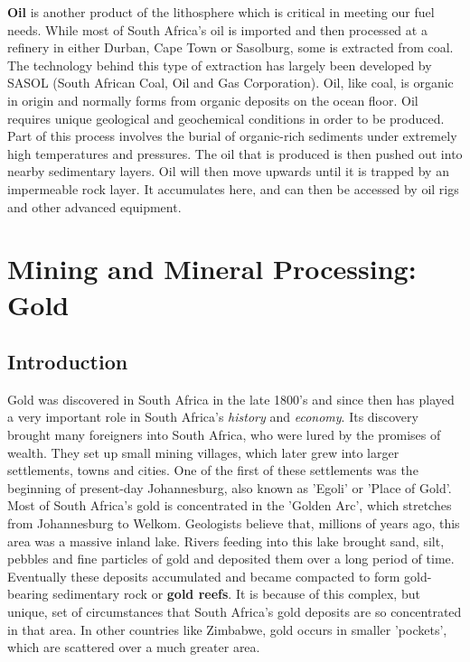 \textbf{Oil} is another product of the lithosphere which is critical in meeting our fuel needs. While most of South Africa's oil is imported and then processed at a refinery in either Durban, Cape Town or Sasolburg, some is extracted from coal. The technology behind this type of extraction has largely been developed by SASOL (South African Coal, Oil and Gas Corporation). Oil, like coal, is organic in origin and normally forms from organic deposits on the ocean floor. Oil requires unique geological and geochemical conditions in order to be produced. Part of this process involves the burial of organic-rich sediments under extremely high temperatures and pressures. The oil that is produced is then pushed out into nearby sedimentary layers. Oil will then move upwards until it is trapped by an impermeable rock layer. It accumulates here, and can then be accessed by oil rigs and other advanced equipment.






\section{Mining and Mineral Processing: Gold}

\subsection{Introduction}

Gold was discovered in South Africa in the late 1800's and since then has played a very important role in South Africa's \emph{history} and \emph{economy}. Its discovery brought many foreigners into South Africa, who were lured by the promises of wealth. They set up small mining villages, which later grew into larger settlements, towns and cities. One of the first of these settlements was the beginning of present-day Johannesburg, also known as 'Egoli' or 'Place of Gold'.\\

Most of South Africa's gold is concentrated in the 'Golden Arc', which stretches from Johannesburg to Welkom. Geologists believe that, millions of years ago, this area was a massive inland lake. Rivers feeding into this lake brought sand, silt, pebbles and fine particles of gold and deposited them over a long period of time. Eventually these deposits accumulated and became compacted to form gold-bearing sedimentary rock or \textbf{gold reefs}. It is because of this complex, but unique, set of circumstances that South Africa's gold deposits are so concentrated in that area. In other countries like Zimbabwe, gold occurs in smaller 'pockets', which are scattered over a much greater area.

